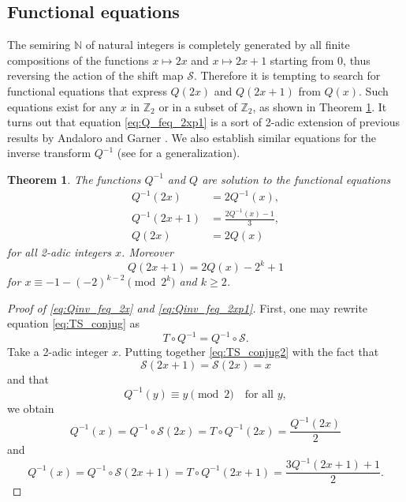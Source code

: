 \documentclass[12pt]{article}
\newtheorem{theorem}{Theorem}
\theoremstyle{definition}
\begin{document}
\subsection{Functional equations}
\label{sub:feq}
The semiring $\mathbb N$ of natural integers is completely generated by all finite compositions of the functions $x \longmapsto 2x$ and $x\longmapsto 2x+1$ starting from 0, thus reversing the action of the shift map $\mathcal{S}$. Therefore it is tempting to search for functional equations that express $Q(2x)$ and $Q(2x+1)$ from $Q(x)$. Such equations exist for any $x$ in $\mathbb Z_{2}$ or in a subset of $\mathbb Z_{2}$, as shown in Theorem \ref{th:Q_feq}. It turns out that equation \eqref{eq:Q_feq_2xp1} is a sort of 2-adic extension of previous results by Andaloro \cite{And00} and Garner \cite{Gar85}. We also establish similar equations for the inverse transform $Q^{-1}$ (see \cite{Edg12} for a generalization).
\begin{theorem} \label{th:Q_feq}
The functions $Q^{-1}$ and $Q$ are solution to the functional equations
\begin{align}
 Q^{-1}(2 x) &= 2 Q^{-1}(x),  \label{eq:Qinv_feq_2x} \\
 Q^{-1}(2 x + 1) &= \frac{2 Q^{-1}(x) - 1}{3}, \label{eq:Qinv_feq_2xp1} \\
 Q(2 x) &= 2 Q(x)  \label{eq:Q_feq_2x} 
\end{align}
 for all 2-adic integers $x$. Moreover 
\begin{equation}
 Q(2 x + 1) = 2 Q(x) - 2^k + 1  \label{eq:Q_feq_2xp1} 
\end{equation}
for $x \equiv -1 - (-2)^{k-2}  \pmod{2^{k}}$ and $k \geq 2$.
\end{theorem}

\begin{proof}[Proof of \eqref{eq:Qinv_feq_2x} and \eqref{eq:Qinv_feq_2xp1}]
First, one may rewrite equation \eqref{eq:TS_conjug} as
\begin{equation}\label{eq:TS_conjug2}
 T \circ Q^{-1} = Q^{-1} \circ \mathcal{S}. 
\end{equation}
Take a 2-adic integer $x$. Putting together \eqref{eq:TS_conjug2} with the fact that $$\mathcal{S}(2x+1) = \mathcal{S}(2x) = x$$ and that $$Q^{-1}(y) \equiv y \pmod{2} \quad \text{for all }y,$$  we obtain
$$Q^{-1}(x) = Q^{-1} \circ \mathcal{S}(2x) = T \circ Q^{-1}(2x) = \frac{Q^{-1}(2x)}{2}$$
and
$$Q^{-1}(x) = Q^{-1} \circ \mathcal{S}(2x+1)  = T \circ Q^{-1}(2x+1) = \frac{3 Q^{-1}(2x+1) + 1}{2}.$$
\end{proof}
\end{document}
